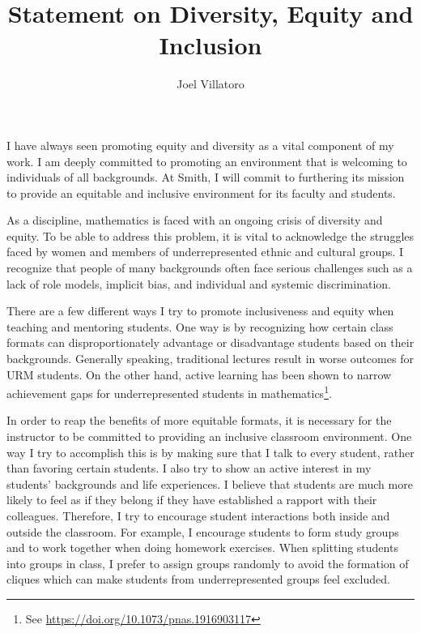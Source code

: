 \documentclass{article}
\title{Statement on Diversity, Equity and Inclusion}
\author{Joel Villatoro}
\date{}
\begin{document}
\vspace{-0.5in}
\maketitle

I have always seen promoting equity and diversity as a vital component of my work. I am deeply committed to promoting an environment that is welcoming to individuals of all backgrounds. At Smith, I will commit to furthering its mission to provide an equitable and inclusive environment for its faculty and students.

As a discipline, mathematics is faced with an ongoing crisis of diversity and equity. To be able to address this problem, it is vital to acknowledge the struggles faced by women and members of underrepresented ethnic and cultural groups. I recognize that people of many backgrounds often face serious challenges such as a lack of role models, implicit bias, and individual and systemic discrimination. 

There are a few different ways I try to promote inclusiveness and equity when teaching and mentoring students. One way is by recognizing how certain class formats can disproportionately advantage or disadvantage students based on their backgrounds. Generally speaking, traditional lectures result in worse outcomes for URM students. On the other hand, active learning has been shown to narrow achievement gaps for underrepresented students in mathematics\footnote{See \url{https://doi.org/10.1073/pnas.1916903117}}. 

In order to reap the benefits of more equitable formats, it is necessary for the instructor to be committed to providing an inclusive classroom environment. One way I try to accomplish this is by making sure that I talk to every student, rather than favoring certain students. I also try to show an active interest in my students' backgrounds and life experiences. I believe that students are much more likely to feel as if they belong if they have established a rapport with their colleagues. Therefore, I try to encourage student interactions both inside and outside the classroom. For example, I encourage students to form study groups and to work together when doing homework exercises. When splitting students into groups in class, I prefer to assign groups randomly to avoid the formation of cliques which can make students from underrepresented groups feel excluded.
\end{document}
